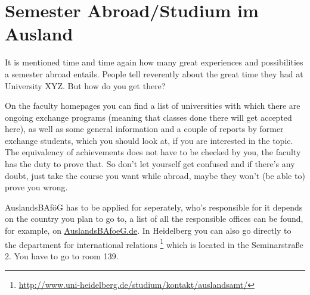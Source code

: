 \section{Semester Abroad/Studium im Ausland}
It is mentioned time and time again how many great experiences and possibilities a semester abroad entails. People tell reverently about the great time they had at University XYZ. But how do you get there?

On the faculty homepages you can find a list of universities with which there are ongoing exchange programs (meaning that classes done there will get accepted here), as well as some general information and a couple of reports by former exchange students, which you should look at, if you are interested in the topic. The equivalency of achievements does not have to be checked by you, the faculty has the duty to prove that. So don't let yourself get confused and if there's any doubt, just take the course you want while abroad, maybe they won't (be able to) prove you wrong.


AuslandsBAföG has to be applied for seperately, who's responsible for it depends on the country you plan to go to, a list of all the responsible offices can be found, for example, on \url{AuslandsBAfoeG.de}. In Heidelberg you can also go directly to the department for international relations \footnote{\url{http://www.uni-heidelberg.de/studium/kontakt/auslandsamt/}} which is located in the Seminarstraße 2. You have to go to room 139.

